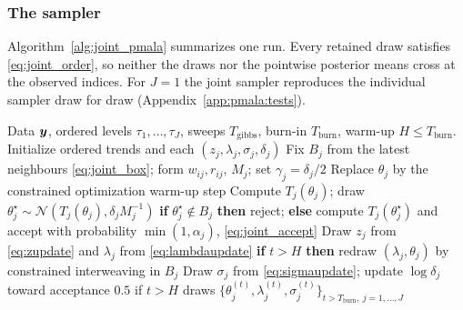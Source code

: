 \subsubsection{The sampler}

Algorithm~\ref{alg:joint_pmala} summarizes one run. Every retained draw satisfies \eqref{eq:joint_order}, so neither the draws nor the pointwise posterior means cross at the observed indices. For $J=1$ the joint sampler reproduces the individual sampler draw for draw (Appendix~\ref{app:pmala:tests}).

\begin{algorithm}[!htbp]
\caption{Joint Bayesian-PMALA for ordered quantile levels}
\label{alg:joint_pmala}
\begin{algorithmic}[1]
\Require Data $\bm{y}$, ordered levels $\tau_1,\ldots,\tau_J$, sweeps $T_{\mathrm{gibbs}}$, burn-in $T_{\mathrm{burn}}$, warm-up $H\leq T_{\mathrm{burn}}$.
\State Initialize ordered trends and each $(z_j,\lambda_j,\sigma_j,\delta_j)$ 
        \State Fix $B_j$ from the latest neighbours \eqref{eq:joint_box}; form $w_{ij}, r_{ij}$, $M_j$; set $\gamma_j = \delta_j/2$
            \State Replace $\theta_j$ by the constrained optimization warm-up step
        \Else
            \State Compute $T_j(\theta_j)$; draw $\theta_j^\star \sim \mathcal N(T_j(\theta_j), \delta_jM_j^{-1})$ 
            \State \textbf{if} $\theta_j^\star\notin B_j$ \textbf{then} reject; \textbf{else} compute $T_j(\theta_j^\star)$ and accept with probability $\min(1,\alpha_j)$, \eqref{eq:joint_accept}
        \EndIf
        \State Draw $z_j$ from \eqref{eq:zupdate} and $\lambda_j$ from \eqref{eq:lambdaupdate}
        \State \textbf{if} $t>H$ \textbf{then} redraw $(\lambda_j,\theta_j)$ by constrained interweaving in $B_j$
        \State Draw $\sigma_j$ from \eqref{eq:sigmaupdate}; update $\log\delta_j$ toward acceptance $0.5$ if $t > H$
    \EndFor
\EndFor
\State \Return draws $\{\theta_j^{(t)}, \lambda_j^{(t)}, \sigma_j^{(t)}\}_{t > T_{\mathrm{burn}},\ j = 1,\ldots,J}$
\end{algorithmic}
\end{algorithm}
